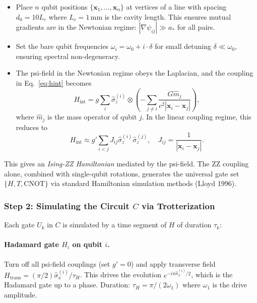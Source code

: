 \documentclass[11pt]{article}
\theoremstyle{definition}
\theoremstyle{remark}
\newcommand{\astar}{a_*}
\begin{document}
\begin{itemize}
\item Place $n$ qubit positions $\{\mathbf{x}_1, \ldots, \mathbf{x}_n\}$
  at vertices of a line with spacing $d_0 = 10 L_c$ where $L_c = 1\,\mathrm{mm}$
  is the cavity length. This ensures mutual gradients are in the Newtonian
  regime: $|\nabla\psi_{ij}| \gg \astar$ for all pairs.

\item Set the bare qubit frequencies $\omega_i = \omega_0 + i\cdot\delta$
  for small detuning $\delta \ll \omega_0$, ensuring spectral non-degeneracy.

\item The psi-field in the Newtonian regime obeys the Laplacian, and
  the coupling in Eq.~\eqref{eq:hint} becomes
  \begin{equation}
  H_{\mathrm{int}} = g\sum_i \hat{\sigma}_z^{(i)} \otimes
    \left(-\sum_{j\neq i} \frac{G\hat{m}_j}{c^2|\mathbf{x}_i - \mathbf{x}_j|}\right),
  \label{eq:hint_newton}
  \end{equation}
  where $\hat{m}_j$ is the mass operator of qubit $j$. In the linear
  coupling regime, this reduces to
  \begin{equation}
  H_{\mathrm{int}} \approx g'\sum_{i<j} J_{ij}\hat{\sigma}_z^{(i)}\hat{\sigma}_z^{(j)},
  \quad J_{ij} = \frac{1}{|\mathbf{x}_i - \mathbf{x}_j|}.
  \label{eq:hint_zz}
  \end{equation}
\end{itemize}

This gives an \emph{Ising-ZZ Hamiltonian} mediated by the psi-field.
The ZZ coupling alone, combined with single-qubit rotations, generates
the universal gate set $\{H, T, \mathrm{CNOT}\}$ via standard Hamiltonian
simulation methods (Lloyd 1996).

\subsubsection{Step 2: Simulating the Circuit $C$ via Trotterization}

Each gate $U_k$ in $C$ is simulated by a time segment of $H$ of
duration $\tau_k$:

\paragraph{Hadamard gate $H_i$ on qubit $i$.}
Turn off all psi-field couplings (set $g' = 0$) and apply transverse
field $H_{\mathrm{trans}} = (\pi/2)\hat{\sigma}_x^{(i)}/\tau_H$.
This drives the evolution $e^{-i\pi\hat{\sigma}_x^{(i)}/2}$, which is
the Hadamard gate up to a phase. Duration: $\tau_H = \pi/(2\omega_1)$
where $\omega_1$ is the drive amplitude.
\end{document}

